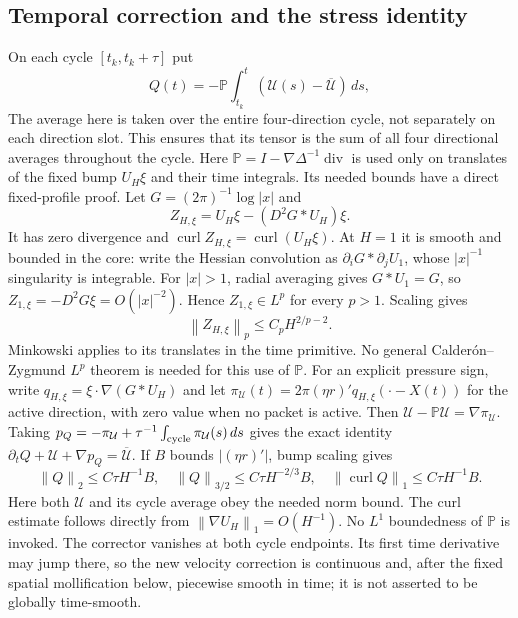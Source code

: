 \documentclass[11pt]{article}
\theoremstyle{remark}\newtheorem{remark}[theorem]{Remark}
\newcommand{\curl}{\operatorname{curl}}
\newcommand{\Div}{\operatorname{div}}
\newcommand{\norm}[2]{\left\|#1\right\|_{#2}}
\begin{document}
\subsection{Temporal correction and the stress identity}
On each cycle $[t_k,t_k+\tau]$ put
\[
 Q(t)=-\mathbb P\int_{t_k}^t
 (\mathcal U(s)-\overline{\mathcal U})\,ds,
\]
The average here is taken over the entire four-direction cycle, not
separately on each direction slot. This ensures that its tensor is the
sum of all four directional averages throughout the cycle.
Here $\mathbb P=I-\nabla\Delta^{-1}\Div$ is used only on translates of
the fixed bump $U_H\xi$ and their time integrals. Its needed bounds have
a direct fixed-profile proof. Let $G=(2\pi)^{-1}\log|x|$ and
\[
 Z_{H,\xi}=U_H\xi-(D^2G*U_H)\xi.
\]
It has zero divergence and $\curl Z_{H,\xi}=\curl(U_H\xi)$.
At $H=1$ it is smooth and bounded in the core: write the Hessian convolution
as $\partial_iG*\partial_jU_1$, whose $|x|^{-1}$ singularity is integrable.
For $|x|>1$, radial averaging gives $G*U_1=G$, so
$Z_{1,\xi}=-D^2G\xi=O(|x|^{-2})$. Hence $Z_{1,\xi}\in L^p$ for every
$p>1$. Scaling gives
\[
 \norm{Z_{H,\xi}}p\leq C_p H^{2/p-2}.
\]
Minkowski applies to its translates in the time primitive. No general
Calderón--Zygmund $L^p$ theorem is needed for this use of $\mathbb P$.
For an explicit pressure sign, write
$q_{H,\xi}=\xi\cdot\nabla(G*U_H)$ and let
$\pi_{\mathcal U}(t)=2\pi(\eta r)'q_{H,\xi}(\cdot-X(t))$
for the active direction, with zero value when no packet is active.
Then $\mathcal U-\mathbb P\mathcal U=\nabla\pi_{\mathcal U}$.
Taking
$p_Q=-\pi_{\mathcal U}+\tau^{-1}\int_{\rm cycle}\pi_{\mathcal U}(s)\,ds$
gives the exact identity
$\partial_tQ+\mathcal U+\nabla p_Q=\overline{\mathcal U}$.
If $B$ bounds $|(\eta r)'|$, bump scaling gives
\begin{equation}\label{eq:Q}
 \norm Q2\leq C\tau H^{-1}B,
 \quad\norm Q{3/2}\leq C\tau H^{-2/3}B,
 \quad\norm{\curl Q}1\leq C\tau H^{-1}B.
\end{equation}
Here both $\mathcal U$ and its cycle average obey the needed norm bound.
The curl estimate follows directly from $\norm{\nabla U_H}1=O(H^{-1})$.
No $L^1$ boundedness of $\mathbb P$ is invoked. The corrector vanishes at both
cycle endpoints. Its first time derivative may jump there, so the new velocity correction
is continuous and, after the fixed spatial mollification below, piecewise
smooth in time; it is not asserted to
be globally time-smooth.
\end{document}
